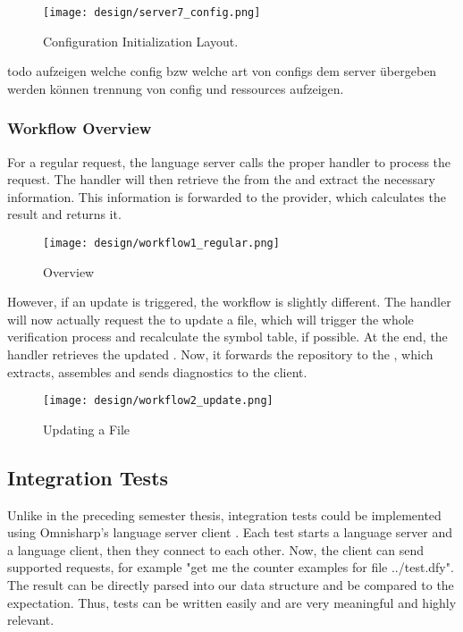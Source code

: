 \begin{figure}[h]
    \centering
    \texttt{[image: design/server7\_config.png]}
    \caption{Configuration Initialization Layout.}
    \label{fig:server_config}
\end{figure}

todo aufzeigen welche config bzw welche art von configs dem server übergeben werden können
trennung von config und ressources aufzeigen.


\subsubsection{Workflow Overview}
For a regular request, the language server calls the proper handler to process the request.
The handler will then retrieve the  from the  and extract the necessary information.
This information is forwarded to the provider, which calculates the result and returns it.

\begin{figure}[H]
    \centering
    \texttt{[image: design/workflow1\_regular.png]}
    \caption{Overview}
    \label{fig:server_overview}
\end{figure}


However, if an update is triggered, the workflow is slightly different.
The handler will now actually request the  to update a file, which will trigger the whole verification process and recalculate the symbol table, if possible.
At the end, the handler retrieves the updated .
Now, it forwards the repository to the , which extracts, assembles and sends diagnostics to the client.

\begin{figure}[H]
    \centering
    \texttt{[image: design/workflow2\_update.png]}
    \caption{Updating a File}
    \label{fig:server_update}
\end{figure}


\subsection{Integration Tests}
\label{chapter:designTests}
Unlike in the preceding semester thesis, integration tests could be implemented using Omnisharp's language server client \cite{omnisharpClient}.
Each test starts a language server and a language client, then they connect to each other.
Now, the client can send supported requests, for example "get me the counter examples for file ../test.dfy".
The result can be directly parsed into our  data structure and be compared to the expectation.
Thus, tests can be written easily and are very meaningful and highly relevant.

